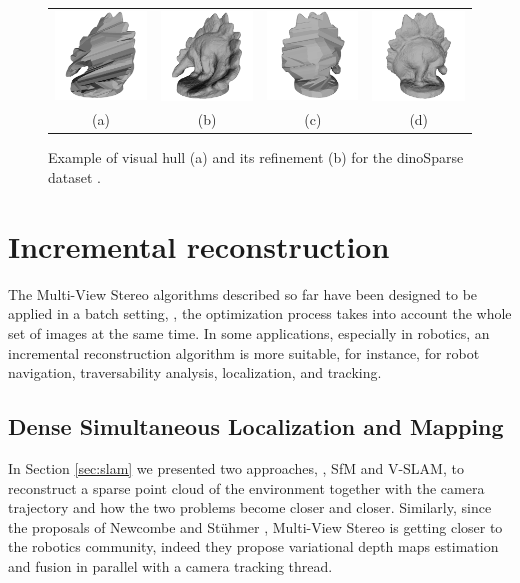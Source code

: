 \begin{figure}[t]
\centering
 \begin{tabular}{cccc}
  \includegraphics[width=0.2\columnwidth]{./img/ch_soa/dinoHull01}&
  \includegraphics[width=0.2\columnwidth]{./img/ch_soa/dinoRef01}&
  \includegraphics[width=0.2\columnwidth]{./img/ch_soa/dinoHull02}&
  \includegraphics[width=0.2\columnwidth]{./img/ch_soa/dinoRef02}\\
  (a)&(b)&(c)&(d)
 \end{tabular}
 \caption{Example of visual hull (a) and its refinement (b) for the dinoSparse dataset \cite{seitz_et_al06}.}
 \label{fig:visualhullex}
\end{figure}
\section{Incremental reconstruction} 
\label{sec:incr}
The Multi-View Stereo algorithms described so far have been designed to be applied in a batch setting, \ie, the optimization process takes into account the whole set of images at the same time.
In some applications, especially in robotics, an incremental reconstruction algorithm is more suitable, for instance, for robot navigation, traversability analysis, localization, and tracking.
\subsection{Dense Simultaneous Localization and Mapping}
In Section \ref{sec:slam} we presented two approaches, \ie, SfM and V-SLAM, to reconstruct a sparse point cloud of the environment together with the camera trajectory and how the two problems become closer and closer.
Similarly, since the proposals of Newcombe \etal \cite{newcombe2010live,newcombe2011kinectfusion,newcombe2011dtam} and St{\"u}hmer \etal \cite{stuhmer2010real}, Multi-View Stereo is getting closer to the robotics community, indeed they propose variational depth maps estimation and fusion in parallel with a camera tracking thread.

